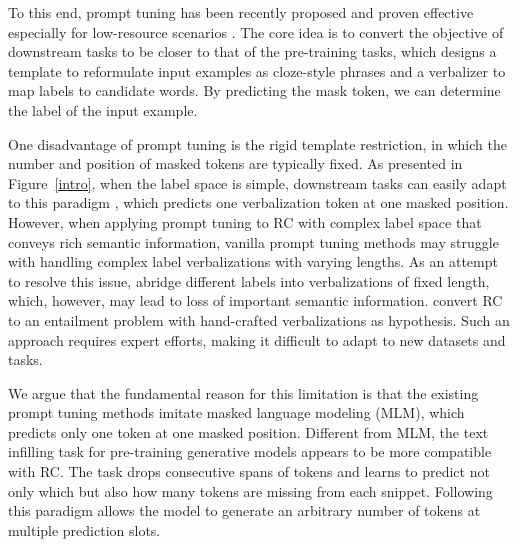 \documentclass[11pt]{article}
\begin{document}
	To this end, prompt tuning \cite{DBLP:conf/nips/BrownMRSKDNSSAA20, schick-schutze-2021-exploiting, schick-schutze-2021-just, DBLP:journals/corr/abs-2107-13586} has been recently proposed and proven effective especially for low-resource scenarios \cite{gao-etal-2021-making, DBLP:conf/naacl/ScaoR21}. The core idea is to convert the objective of downstream tasks to be closer to that of the pre-training tasks, which designs a template to reformulate input examples as cloze-style phrases and a verbalizer to map labels to candidate words. By predicting the mask token, we can determine the label of the input example. 
	
	
	One disadvantage of prompt tuning is the rigid template restriction, in which the number and position of masked tokens are typically fixed. As presented in Figure~\ref{intro},
	when the label space is simple, downstream tasks can easily adapt to this paradigm \cite{DBLP:conf/acl/HambardzumyanKM20, DBLP:conf/emnlp/LesterAC21}, which predicts one verbalization token at one masked position. However, when applying prompt tuning to RC with complex label space that conveys rich semantic information, vanilla prompt tuning methods may struggle with handling complex label verbalizations with varying lengths. As an attempt to resolve this issue, \citet{DBLP:journals/corr/abs-2105-11259} abridge different labels into verbalizations of fixed length, which, however, may lead to loss of important semantic information. \citet{DBLP:conf/emnlp/SainzLLBA21} convert RC to an entailment problem with hand-crafted verbalizations as hypothesis. Such an approach requires expert efforts, making it difficult to adapt to new datasets and tasks.
	
	
	We argue that the fundamental reason for this limitation is that the existing prompt tuning methods imitate masked language modeling (MLM), which predicts only one token at one masked position. Different from MLM, the text infilling task \cite{DBLP:journals/corr/abs-1901-00158} for pre-training generative models \cite{lewis-etal-2020-bart, DBLP:journals/jmlr/RaffelSRLNMZLL20} appears to be more compatible with RC. The task drops consecutive spans of tokens and learns to predict not only which but also how many tokens are missing from each snippet. Following this paradigm allows the model to generate an arbitrary number of tokens at multiple prediction slots.
	
\end{document}
